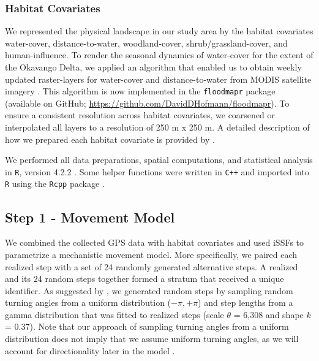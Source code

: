\documentclass[../FinalThesis.tex]{subfiles}
\begin{document}
\subsubsection{Habitat Covariates}

We represented the physical landscape in our study area by the habitat
covariates \textsf{water-cover, distance-to-water, woodland-cover,
shrub/grassland-cover, and human-influence}. To render the seasonal dynamics of
water-cover for the extent of the Okavango Delta, we applied an algorithm that
enabled us to obtain weekly updated raster-layers for \textsf{water-cover} and
\textsf{distance-to-water} from MODIS satellite imagery \citep{Wolski.2017,
Hofmann.2021}. This algorithm is now implemented in the \texttt{floodmapr}
package (available on GitHub; \url{https://github.com/DavidDHofmann/floodmapr}).
To ensure a consistent resolution across habitat covariates, we coarsened or
interpolated all layers to a resolution of 250 m x 250 m. A detailed description
of how we prepared each habitat covariate is provided by \citet{Hofmann.2021}.

We performed all data preparations, spatial computations, and statistical
analysis in \texttt{R}, version 4.2.2 \citep{RCoreTeam.2023}. Some helper
functions were written in \texttt{C++} and imported into \texttt{R} using the
\texttt{Rcpp} package \citep{Eddelbuettel.2011, Eddelbuettel.2013,
Eddelbuettel.2018}.

\subsection{Step 1 - Movement Model}

We combined the collected GPS data with habitat covariates and used iSSFs
\citep{Avgar.2016} to parametrize a mechanistic movement model. More
specifically, we paired each realized step with a set of 24 randomly generated
alternative steps. A realized and its 24 random steps together formed a stratum
that received a unique identifier. As suggested by \citet{Avgar.2016}, we
generated random steps by sampling random turning angles from a uniform
distribution (\(-\pi, +\pi\)) and step lengths from a gamma distribution that
was fitted to realized steps (scale \(\theta\) = 6,308 and shape \(k\) = 0.37).
Note that our approach of sampling turning angles from a uniform distribution
does not imply that we assume uniform turning angles, as we will account for
directionality later in the model \citep{Avgar.2016, Fieberg.2021}.
\end{document}
